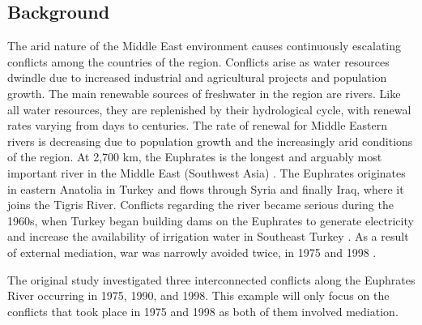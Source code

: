 \documentclass[letterpaper,12pt,titlepage,oneside,final]{book}
\begin{document}
\subsection{Background}
The arid nature of the Middle East environment causes continuously escalating conflicts among the countries of the region. Conflicts arise as water resources dwindle due to increased industrial and agricultural projects and population growth. The main renewable sources of freshwater in the region are rivers. Like all water resources, they are replenished by their hydrological cycle, with renewal rates varying from days to centuries. The rate of renewal for Middle Eastern rivers is decreasing due to population growth and the increasingly arid conditions of the region. At 2,700 km, the Euphrates is the longest and arguably most important river in the Middle East (Southwest Asia) \citep{kolars1991euphrates}.
The Euphrates originates in eastern Anatolia in Turkey and flows through Syria and finally Iraq, where it joins the Tigris River. Conflicts regarding the river became serious during the 1960s, when Turkey began building dams on the Euphrates to generate electricity and increase the availability of irrigation water in Southeast Turkey \citep{akanda2007tigris}. As a result of external mediation, war was narrowly avoided twice, in 1975 and 1998 \citep{akanda2007tigris}.

The original study investigated three interconnected conflicts along the Euphrates River occurring in 1975, 1990, and 1998. This example will only focus on the conflicts that took place in 1975 and 1998 as both of them involved mediation. 
\end{document}
